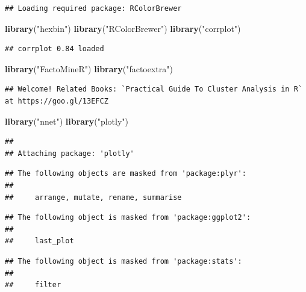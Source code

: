 \documentclass[]{article}
\newenvironment{Shaded}{\begin{snugshade}}{\end{snugshade}}
\newcommand{\KeywordTok}[1]{\textcolor[rgb]{0.13,0.29,0.53}{\textbf{#1}}}
\newcommand{\StringTok}[1]{\textcolor[rgb]{0.31,0.60,0.02}{#1}}
\newcommand{\NormalTok}[1]{#1}
\begin{document}
\begin{verbatim}
## Loading required package: RColorBrewer
\end{verbatim}

\begin{Shaded}
\begin{Highlighting}[]
\KeywordTok{library}\NormalTok{(}\StringTok{"hexbin"}\NormalTok{)}
\KeywordTok{library}\NormalTok{(}\StringTok{"RColorBrewer"}\NormalTok{)}
\KeywordTok{library}\NormalTok{(}\StringTok{"corrplot"}\NormalTok{)}
\end{Highlighting}
\end{Shaded}

\begin{verbatim}
## corrplot 0.84 loaded
\end{verbatim}

\begin{Shaded}
\begin{Highlighting}[]
\KeywordTok{library}\NormalTok{(}\StringTok{"FactoMineR"}\NormalTok{)}
\KeywordTok{library}\NormalTok{(}\StringTok{"factoextra"}\NormalTok{)}
\end{Highlighting}
\end{Shaded}

\begin{verbatim}
## Welcome! Related Books: `Practical Guide To Cluster Analysis in R` at https://goo.gl/13EFCZ
\end{verbatim}

\begin{Shaded}
\begin{Highlighting}[]
\KeywordTok{library}\NormalTok{(}\StringTok{"nnet"}\NormalTok{)}
\KeywordTok{library}\NormalTok{(}\StringTok{"plotly"}\NormalTok{)}
\end{Highlighting}
\end{Shaded}

\begin{verbatim}
## 
## Attaching package: 'plotly'
\end{verbatim}

\begin{verbatim}
## The following objects are masked from 'package:plyr':
## 
##     arrange, mutate, rename, summarise
\end{verbatim}

\begin{verbatim}
## The following object is masked from 'package:ggplot2':
## 
##     last_plot
\end{verbatim}

\begin{verbatim}
## The following object is masked from 'package:stats':
## 
##     filter
\end{verbatim}
\end{document}
